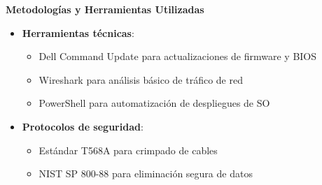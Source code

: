 \textbf{Metodologías y Herramientas Utilizadas}
\begin{itemize}
	\item \textbf{Herramientas técnicas}:
	\begin{itemize}
		\item Dell Command Update para actualizaciones de firmware y BIOS
		\item Wireshark para análisis básico de tráfico de red
		\item PowerShell para automatización de despliegues de SO
	\end{itemize}
	
	\item \textbf{Protocolos de seguridad}:
	\begin{itemize}
		\item Estándar T568A para crimpado de cables
		\item NIST SP 800-88 para eliminación segura de datos
	\end{itemize}
\end{itemize}

